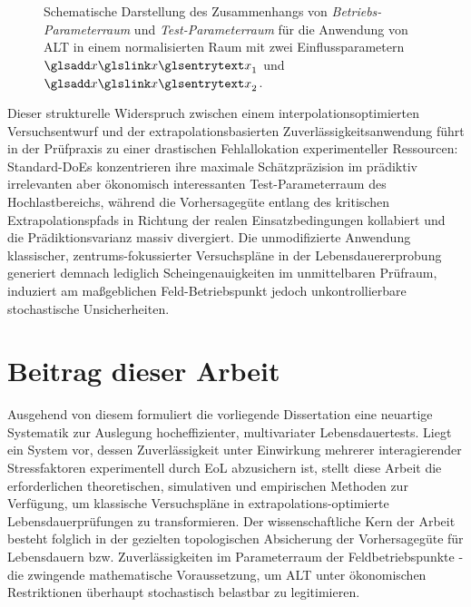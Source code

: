 \begin{figure}[htbp]
      \centering
      \setlength{}
      \setlength\figureheight{7cm}
      
      \caption{Schematische Darstellung des Zusammenhangs von \textit{Betriebs-Parameterraum} und \textit{Test-Parameterraum} für die Anwendung von \ac{ALT} in einem normalisierten Raum mit zwei Einflussparametern $\sym{x}_1$ und $\sym{x}_2$.}
      \label{fig:abb1.01_extrapolation}
\end{figure}

Dieser strukturelle Widerspruch zwischen einem interpolationsoptimierten Versuchsentwurf und der extrapolationsbasierten Zu\-ver\-läs\-sig\-keits\-an\-wen\-dung führt in der Prüf\-praxis zu einer drastischen Fehl\-al\-lo\-ka\-tion ex\-pe\-ri\-men\-tel\-ler Ressourcen:
Stand\-ard-\acp{DoE} konzentrieren ihre maximale Schätzpräzision im prädiktiv irrelevanten aber ökonomisch interessanten Test-Parameterraum des Hochlastbereichs, während die Vorhersagegüte entlang des kritischen Extrapolationspfads in Richtung der realen Einsatzbedingungen kollabiert und die Prädiktionsvarianz massiv divergiert.
Die unmodifizierte Anwendung klassischer, zentrums-fokussierter Versuchspläne in der Lebensdauererprobung generiert demnach lediglich Scheingenauigkeiten im unmittelbaren Prüfraum, induziert am maßgeblichen Feld-Betriebspunkt jedoch unkontrollierbare stochastische Unsicherheiten.

\section{Beitrag dieser Arbeit} \label{sec:beitrag}

Ausgehend von diesem  formuliert die vorliegende Dissertation eine neuartige Systematik zur Auslegung hocheffizienter, multivariater Lebensdauertests.
Liegt ein System vor, dessen Zuverlässigkeit unter Einwirkung mehrerer interagierender Stressfaktoren experimentell durch \ac{EoL} abzusichern ist, stellt diese Arbeit die erforderlichen theoretischen, simulativen und empirischen Methoden zur Verfügung, um klassische Versuchspläne in extrapolations-optimierte Lebensdauerprüfungen zu transformieren.
Der wissenschaftliche Kern der Arbeit besteht folglich in der gezielten topologischen Absicherung der Vorhersagegüte für Lebensdauern bzw. Zuverlässigkeiten im Parameterraum der Feldbetriebspunkte - die zwingende mathematische Voraussetzung, um \ac{ALT} unter ökonomischen Restriktionen überhaupt stochastisch belastbar zu legitimieren.

